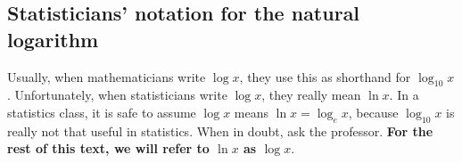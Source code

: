 \subsection{Statisticians' notation for the natural logarithm}

Usually, when mathematicians write $\log x$, they use this as shorthand for $\log_{10} x$. 
Unfortunately, when statisticians write $\log x$, they really mean $\ln x$. In a statistics class, it 
is safe to assume $\log x$ means $\ln x = \log_e x$, because $\log_{10} x$ is really not that useful in statistics. 
When in doubt, ask the professor. \textbf{For the rest of this text, we will refer to $\ln x$ as $\log x$}.